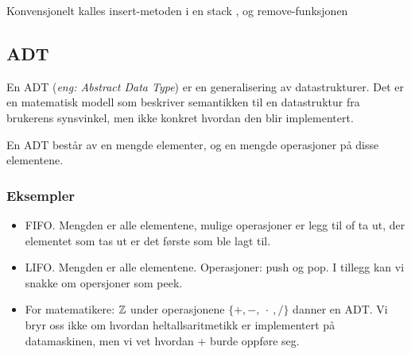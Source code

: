 Konvensjonelt kalles insert-metoden i en stack , og remove-funksjonen 


\subsection{ADT}
En ADT (\textit{eng: Abstract Data Type}) er en generalisering av datastrukturer. Det er en matematisk modell som beskriver semantikken til en datastruktur fra brukerens synsvinkel, men ikke konkret hvordan den blir implementert. 

\begin{definition}
	En ADT består av en mengde elementer, og en mengde operasjoner på disse elementene. 
\end{definition}

\subsubsection{Eksempler}
\begin{itemize}
	\item FIFO. Mengden  er alle elementene, mulige operasjoner er legg til of ta ut, der elementet som tas ut er det første som ble lagt til.
	\item LIFO. Mengden er alle elementene. Operasjoner: push og pop. I tillegg kan vi snakke om opersjoner som peek.
	\item For matematikere: $ \mathbb{Z} $ under operasjonene $ \{+, -, ~\cdot~, /\} $ danner en ADT. Vi bryr oss ikke om hvordan heltallsaritmetikk er implementert på datamaskinen, men vi vet hvordan $ + $ burde oppføre seg.
\end{itemize}
